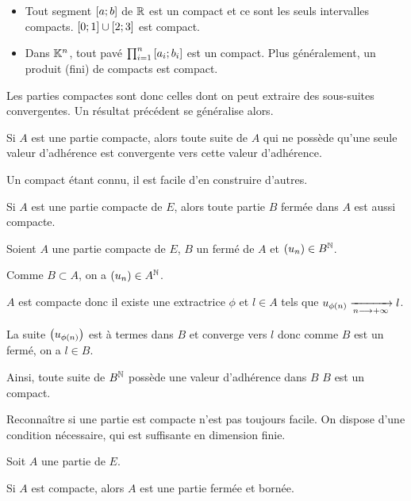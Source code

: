 \begin{ex}
\begin{itemize}
    \item Tout segment \(\left[a;b\right]\) de \(\mathbb{R}\) est un compact et ce sont les seuls intervalles compacts. \(\left[0;1\right]\cup\left[2;3\right]\) est compact. \\
    \item Dans \(\mathbb{K}^n\), tout pavé \(\prod_{i=1}^n\left[a_i;b_i\right]\) est un compact. Plus généralement, un produit (fini) de compacts est compact.
\end{itemize}
\end{ex}

Les parties compactes sont donc celles dont on peut extraire des sous-suites convergentes. Un résultat précédent se généralise alors.

\begin{prop}
Si \(A\) est une partie compacte, alors toute suite de \(A\) qui ne possède qu'une seule valeur d'adhérence est convergente vers cette valeur d'adhérence.
\end{prop}

Un compact étant connu, il est facile d'en construire d'autres.

\begin{prop}
Si \(A\) est une partie compacte de \(E\), alors toute partie \(B\) fermée dans \(A\) est aussi compacte.
\end{prop}

\begin{dem}
Soient \(A\) une partie compacte de \(E\), \(B\) un fermé de \(A\) et \(\left(u_n\right)\in B^{\mathbb{N}}\).

Comme \(B\subset A\), on a \(\left(u_n\right)\in A^{\mathbb{N}}\).

\(A\) est compacte donc il existe une extractrice \(\phi\) et \(l\in A\) tels que \(u_{\phi\left(n\right)}\xrightarrow[n\longrightarrow+\infty]{}l\).

La suite \(\left(u_{\phi\left(n\right)}\right)\) est à termes dans \(B\) et converge vers \(l\) donc comme \(B\) est un fermé, on a \(l\in B\).

Ainsi, toute suite de \(B^{\mathbb{N}}\) possède une valeur d'adhérence dans \(B\) \ie \(B\) est un compact.
\end{dem}

Reconnaître si une partie est compacte n'est pas toujours facile. On dispose d'une condition nécessaire, qui est suffisante en dimension finie.

\begin{prop}
Soit \(A\) une partie de \(E\).

Si \(A\) est compacte, alors \(A\) est une partie fermée et bornée.
\end{prop}

